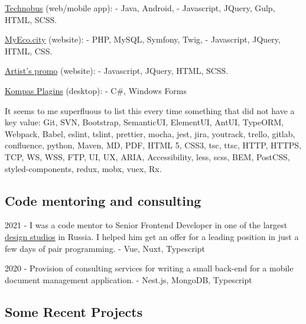 \documentclass{yb}
\begin{document}
\href{https://nikitait.github.io/ru.returnonintelligence.technobus.front}{Technobus} (web/mobile app):
\newline - Java, Android,
\newline - Javascript, JQuery, Gulp, HTML, SCSS.

\href{https://github.com/HackSpb/eco-project}{MyEco.city} (website):
\newline - PHP, MySQL, Symfony, Twig,
\newline - Javascript, JQuery, HTML, CSS.

\href{https://nikitait.github.io/xDontStopMeNow/}{Artist's promo} (website):
\newline - Javascript, JQuery, HTML, SCSS.

\href{https://github.com/NikitaIT/Projects/tree/master/Kompas Delail Plagin C\%23}{Kompas Plagins} (desktop):
\newline - C\#, Windows Forms

It seems to me superfluous to list this every time something that did not have a key value: Git, SVN, Bootstrap, SemanticUI, ElementUI, AntUI, TypeORM, Webpack, Babel, eslint, tslint, prettier, mocha, jest, jira, youtrack, trello, gitlab, confluence, python, Maven, MD, PDF, HTML 5, CSS3, tsc, ttsc, HTTP, HTTPS, TCP, WS, WSS, FTP, UI, UX, ARIA, Accessibility, less, scss, BEM, PostCSS, styled-components, redux, mobx, vuex, Rx.

\begin{samepage}
\subsection*{Code mentoring and consulting}

2021 - I was a code mentor to Senior Frontend Developer in one of the largest \href{https://pinkman.ru/}{design studios} in Russia. I helped him get an offer for a leading position in just a few days of pair programming.
\newline - Vue, Nuxt, Typescript

2020 - Provision of consulting services for writing a small back-end for a mobile document management application.
\newline - Nest.js, MongoDB, Typescript

\end{samepage}

\subsection*{Some Recent Projects}
\end{document}
